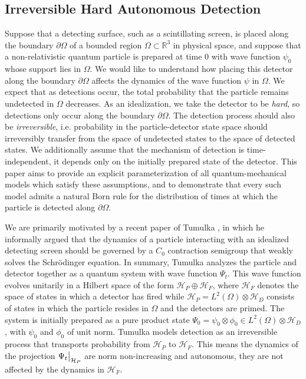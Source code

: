 \documentclass{article}
\numberwithin{equation}{section}
\begin{document}
\subsection{Irreversible Hard Autonomous Detection}
Suppose that a detecting surface, such as a scintillating screen, is placed along the boundary $\partial \Omega$ of a bounded region $\Omega \subset \mathbb{R}^3$ in physical space, and suppose that a non-relativistic quantum particle is prepared at time $0$ with wave function $\psi_0$ whose support lies in $\Omega$. We would like to understand how placing this detector along the boundary $\partial \Omega$ affects the dynamics of the wave function $\psi$ in $\Omega$. We expect that as detections occur, the total probability that the particle remains undetected in $\Omega$ decreases. As an idealization, we take the detector to be \textit{hard}, so detections only occur along the boundary $\partial \Omega$. The detection process should also be \textit{irreversible}, i.e. probability in the particle-detector state space should irreversibly transfer from the space of undetected states to the space of detected states. We additionally assume that the mechanism of detection is time-independent, it depends only on the initially prepared state of the detector. This paper aims to provide an explicit parameterization of all quantum-mechanical models which satisfy these assumptions, and to demonstrate that every such model admits a natural Born rule for the distribution of times at which the particle is detected along $\partial \Omega$.
\par
We are primarily motivated by a recent paper of Tumulka \cite{TUMULKA2022168910}, in which he informally argued that the dynamics of a particle interacting with an idealized detecting screen should be governed by a $C_0$ contraction semigroup that weakly solves the Schr\"odinger equation. In summary, Tumulka analyzes the particle and detector together as a quantum system with wave function $\Psi_t$. This wave function evolves unitarily in a Hilbert space of the form $\mathcal{H}_P\oplus\mathcal{H}_F$, where $\mathcal{H}_F$ denotes the space of states in which a detector has fired while $\mathcal{H}_P=L^2(\Omega)\otimes\mathcal{H}_D$ consists of states in which the particle resides in $\Omega$ and the detectors are primed. The system is initially prepared as a pure product state $\Psi_0=\psi_0\otimes\phi_0\in L^2(\Omega)\otimes\mathcal{H}_D$, with $\psi_0$ and $\phi_0$ of unit norm. Tumulka models detection as an irreversible process that transports probability from $\mathcal{H}_P$ to $\mathcal{H}_F$. This means the dynamics of the projection $\Psi_t \big{|}_{\mathcal{H}_P}$ are norm non-increasing and autonomous, they are not affected by the dynamics in $\mathcal{H}_F$.
\end{document}
